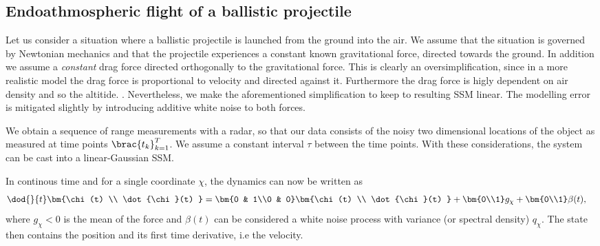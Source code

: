 

\subsection{Endoathmospheric flight of a ballistic projectile}\label{sec:ballistic}
Let us consider a situation where a ballistic projectile is launched
from the ground into the air. We assume that the situation is governed by Newtonian
mechanics and that the projectile experiences a constant known gravitational
force, directed towards the ground. In addition we assume a \emph{constant}
drag force directed orthogonally to the gravitational force. This is clearly
an oversimplification, since in a more realistic model the drag
force is proportional to velocity and directed against it. Furthermore
the drag force is higly dependent on air density and so the altitide. \parencite{ristic2004beyond}.
Nevertheless, we make the aforementioned simplification to keep to resulting
SSM linear. The modelling error is mitigated slightly by introducing
additive white noise to both forces.

We obtain a sequence of range measurements with a radar,
so that our data consists of the noisy two dimensional locations 
of the object as measured at time points $\brac{t_k}_{k=1}^T$.
We assume a constant interval $\tau$ between the time points. With these 
considerations, the system can be cast into a linear-Gaussian SSM. 

In continous time and for a single coordinate $\chi$, 
the dynamics can now be written as
\begin{align}
	\dod{}{t}\bm{\chi(t) \\ \dot{\chi}(t) } &= 
	\bm{0 & 1\\0 & 0}\bm{\chi(t) \\ \dot{\chi}(t) } + \bm{0\\1}g_\chi + \bm{0\\1}\beta(t),
	\label{eq:ct_linear}
\end{align}
where $g_\chi<0$ is the mean of the force and $\beta(t)$ can be considered
a white noise process with variance (or spectral density) $q_\chi$. 
The state then contains the position and its first time derivative, i.e the velocity. 


